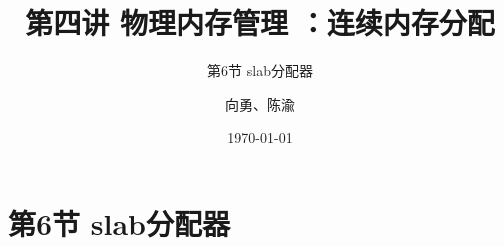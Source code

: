 


\title[第4讲]{第四讲 物理内存管理 ：连续内存分配} %
\subtitle{第6节 slab分配器}
\author{向勇、陈渝} %
\date{\today} %



\begin{frame}
\titlepage %
\end{frame}


\section{第6节 slab分配器}%

